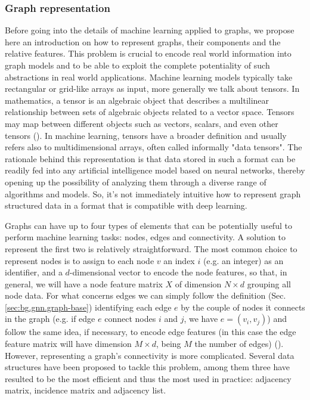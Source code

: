 \documentclass[binding=0.6cm]{sapthesis}
\newcommand{\mycite}[1]{(\cite{#1})}
\begin{document}
\subsubsection{Graph representation}
\label{sec:bg.gnn.graph-repr}
Before going into the details of machine learning applied to graphs, we propose here an introduction on how to represent graphs, their components and the relative features. This problem is crucial to encode real world information into graph models and to be able to exploit the complete potentiality of such abstractions in real world applications. Machine learning models typically take rectangular or grid-like arrays as input, more generally we talk about tensors. In mathematics, a tensor is an algebraic object that describes a multilinear relationship between sets of algebraic objects related to a vector space. Tensors may map between different objects such as vectors, scalars, and even other tensors \mycite{Vasilescu2009AM}. In machine learning, tensors have a broader definition and usually refers also to multidimensional arrays, often called informally "data tensors". The rationale behind this representation is that data stored in such a format can be readily fed into any artificial intelligence model based on neural networks, thereby opening up the possibility of analyzing them through a diverse range of algorithms and models. So, it’s not immediately intuitive how to represent graph structured data in a format that is compatible with deep learning.

Graphs can have up to four types of elements that can be potentially useful to perform machine learning tasks: nodes, edges and connectivity. A solution to represent the first two is relatively straightforward. The most common choice to represent nodes is to assign to each node $v$ an index $i$ (e.g. an integer) as an identifier, and a $d$-dimensional vector to encode the node features, so that, in general, we will have a node feature matrix $X$ of dimension ${N \times d}$ grouping all node data. For what concerns edges we can simply follow the definition (Sec.\ref{sec:bg.gnn.graph-base}) identifying each edge $e$ by the couple of nodes it connects in the graph (e.g. if edge $e$ connect nodes $i$ and $j$, we have $e = (v_i,v_j)$) and follow the same idea, if necessary, to encode edge features (in this case the edge feature matrix will have dimension $M \times d$, being $M$ the number of edges) \mycite{cormen2022introduction}. However, representing a graph’s connectivity is more complicated. Several data structures have been proposed to tackle this problem, among them three have resulted to be the most efficient and thus the most used in practice: adjacency matrix, incidence matrix and adjacency list.
\end{document}
